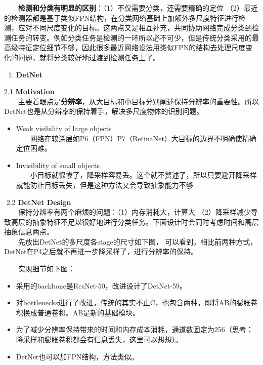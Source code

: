   \textbf{检测和分类有明显的区别}：（1）不仅需要分类，还需要精确的定位
（2）最近的检测器都是基于类似FPN结构，在分类网络基础上加额外多尺度特征进行检测，应对不同尺度变化的目标。这两点又是相互补充，共同协助网络完成分类到检测任务的转变。例如分类任务是检测的一环所以必不可少，但是传统分类采用的最高级特征定位细节不够，因此很多最近网络设法用类似FPN的结构去处理尺度变化的问题，就将分类较好地过渡到检测任务上了。

\begin{enumerate}
\def\labelenumi{\arabic{enumi}.}
\setcounter{enumi}{1}
\item
  \textbf{DetNet}
\end{enumerate}

2.1 \textbf{Motivation}\\
  主要着眼点是\textbf{分辨率}，从大目标和小目标分别阐述保持分辨率的重要性。所以DetNet也是从分辨率的保持着手，解决多尺度物体的识别问题。

\begin{itemize}
\item
  Weak visibility of large objects\\
    网络在较深层如P6（FPN）P7（RetinaNet）大目标的边界不明确使精确定位困难。
\item
  Invisibility of small objects\\
    小目标就很惨了，降采样容易丢。这个就不赘述了，所以只要避开降采样就能防止目标丢失，但是这种方法又会导致抽象能力不够
\end{itemize}

​ 2.2 \textbf{DetNet Design}\\
  保持分辨率有两个麻烦的问题：（1）内存消耗大，计算大
（2）降采样减少导致高层的抽象特征不足以很好地进行分类任务。下面设计时会同时考虑时间和高层抽象信息两点。\\
  先放出DetNet的多尺度各stage的尺寸如下图，
可以看到，相比前两种方式，DetNet在P4之后就不再进一步降采样了，进行分辨率的保持。

\begin{figure}
\centering
\caption{}
\end{figure}

  实现细节如下图：

\begin{figure}
\centering
\caption{}
\end{figure}

\begin{itemize}
\item
  采用的backbone是ResNet-50，改进设计了DetNet-59。
\item
  对bottlenecks进行了改进，传统的其实不止C，也包含两种，即将AB的膨胀卷积换成普通卷积。AB是新的基础模块。
\item
  为了减少分辨率保持带来的时间和内存成本消耗，通道数固定为256（思考：降采样和膨胀卷积都会有信息丢失，这里可以想想）。
\item
  DetNet也可以加FPN结构，方法类似。
\end{itemize}

